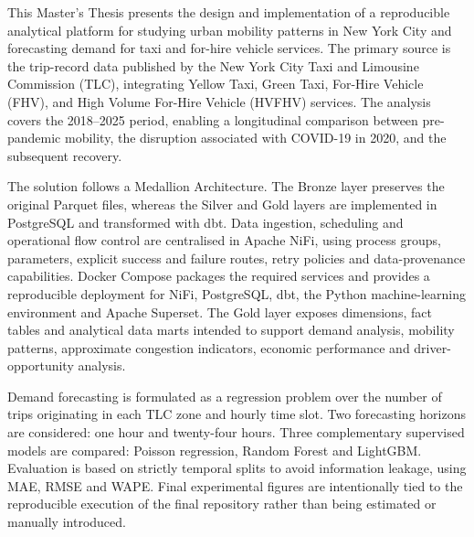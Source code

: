 This Master's Thesis presents the design and implementation of a reproducible analytical platform for studying urban mobility patterns in New York City and forecasting demand for taxi and for-hire vehicle services. The primary source is the trip-record data published by the New York City Taxi and Limousine Commission (TLC), integrating Yellow Taxi, Green Taxi, For-Hire Vehicle (FHV), and High Volume For-Hire Vehicle (HVFHV) services. The analysis covers the 2018--2025 period, enabling a longitudinal comparison between pre-pandemic mobility, the disruption associated with COVID-19 in 2020, and the subsequent recovery.

The solution follows a Medallion Architecture. The Bronze layer preserves the original Parquet files, whereas the Silver and Gold layers are implemented in PostgreSQL and transformed with dbt. Data ingestion, scheduling and operational flow control are centralised in Apache NiFi, using process groups, parameters, explicit success and failure routes, retry policies and data-provenance capabilities. Docker Compose packages the required services and provides a reproducible deployment for NiFi, PostgreSQL, dbt, the Python machine-learning environment and Apache Superset. The Gold layer exposes dimensions, fact tables and analytical data marts intended to support demand analysis, mobility patterns, approximate congestion indicators, economic performance and driver-opportunity analysis.

Demand forecasting is formulated as a regression problem over the number of trips originating in each TLC zone and hourly time slot. Two forecasting horizons are considered: one hour and twenty-four hours. Three complementary supervised models are compared: Poisson regression, Random Forest and LightGBM\@. Evaluation is based on strictly temporal splits to avoid information leakage, using MAE, RMSE and WAPE\@. Final experimental figures are intentionally tied to the reproducible execution of the final repository rather than being estimated or manually introduced.
